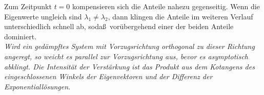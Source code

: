 Zum Zeitpunkt $t=0$ kompensieren sich die Anteile nahezu gegenseitig.
Wenn die Eigenwerte ungleich sind $\lambda_1\neq\lambda_2$, dann klingen die Anteile im weiteren Verlauf unterschiedlich schnell ab, soda\ss\ vor\"ubergehend einer der beiden Anteile dominiert.\\
\textit{Wird ein ged\"ampftes System mit Vorzugsrichtung orthogonal zu dieser Richtung angeregt, so weicht es parallel zur Vorzugsrichtung aus, bevor es asymptotisch abklingt.
Die Intensit\"at der Verst\"arkung ist das Produkt aus dem Kotangens des eingeschlossenen Winkels der Eigenvektoren und der Differenz der Exponentiall\"osungen.}

